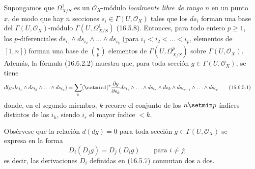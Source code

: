 \begin{env}[16.6.5]
\label{IV.16.6.5}
Supongamos que $\varOmega_{X/S}^1$ es un $\mathcal{O}_X$-módulo \emph{localmente libre
de rango $n$} en un punto $x$, de modo que hay $n$ secciones
$s_i\in\Gamma(U,\mathcal{O}_X)$ tales que los $ds_i$ forman una base del
$\Gamma(U,\mathcal{O}_X)$-módulo $\Gamma(U,\varOmega_{X/S}^1)$ (16.5.8).
Entonces, para todo entero $p\geq1$, los $p$-diferenciales
$ds_{i_1}\wedge ds_{i_2}\wedge\ldots\wedge ds_{i_p}$ (para
$i_1<i_2<\ldots<i_p$, elementos de $[1,n]$) forman una base de
$\binom{n}{p}$ elementos de $\Gamma(U,\varOmega_{X/S}^p)$ sobre
$\Gamma(U,\mathcal{O}_X)$. Además, la fórmula (16.6.2.2) muestra que, para
toda sección $g\in\Gamma(U,\mathcal{O}_X)$, se tiene
\[
  d(g.ds_{i_1}\wedge ds_{i_2}\wedge\ldots\wedge ds_{i_p})
  =\sum_k(\setmin 1)^r\frac{\partial g}{\partial s_k}
  ds_{i_1}\wedge\ldots\wedge ds_{i_r}\wedge ds_k\wedge
  ds_{i_{r+1}}\wedge\ldots\wedge ds_{i_p}
  \tag{16.6.5.1}
  \label{IV.16.6.5.1}
\]
donde, en el segundo miembro, $k$ recorre el conjunto de los $n\setmin p$ índices distintos de los
$i_h$, siendo $i_r$ el mayor índice $<k$.

Obsérvese que la relación $d(dg)=0$ para toda sección
$g\in\Gamma(U,\mathcal{O}_X)$ se expresa en la forma
\[
  D_i(D_jg)=D_j(D_ig)\qquad\text{para $i\neq j$};
\]
es decir, las derivaciones $D_i$ definidas en (16.5.7) conmutan dos a dos.
\end{env}
